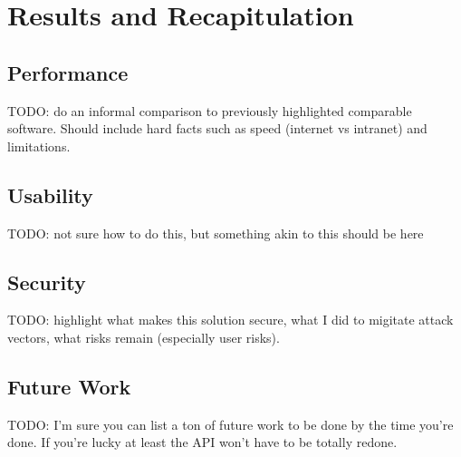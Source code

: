 \chapter{Results and Recapitulation}
\label{chap:results}


\section{Performance}

TODO: do an informal comparison to previously highlighted comparable software.
Should include hard facts such as speed (internet vs intranet) and limitations.

\section{Usability}

TODO: not sure how to do this, but something akin to this should be here

\section{Security}

TODO: highlight what makes this solution secure, what I did to migitate attack vectors, what risks remain (especially user risks).

\section{Future Work}

TODO: I'm sure you can list a ton of future work to be done by the time you're done.
If you're lucky at least the API won't have to be totally redone.
